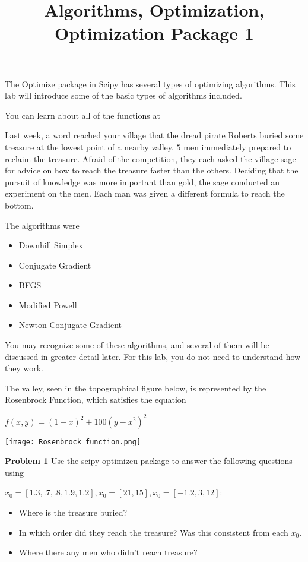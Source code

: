 \documentclass[12pt]{article}
\begin{document}
\title{Algorithms, Optimization, Optimization Package 1}

The Optimize package in Scipy has several types of optimizing algorithms. This lab will introduce some of the basic types of algorithms included.

You can learn about all of the functions at


Last week, a word reached your village that the dread pirate Roberts buried some treasure at the lowest point of a nearby valley. $5$ men immediately prepared to reclaim the treasure. Afraid of the competition, they each asked the village sage for advice on how to reach the treasure faster than the others. Deciding that the pursuit of knowledge was more important than gold, the sage conducted an experiment on the men. Each man was given a different formula to reach the bottom.  

The algorithms were 
\begin{itemize}
\item Downhill Simplex
\item Conjugate Gradient
\item BFGS
\item Modified Powell
\item Newton Conjugate Gradient
\end{itemize}

You may recognize some of these algorithms, and several of them will be discussed in greater detail later. For this lab, you do not need to understand how they work.


The valley, seen in the topographical figure below, is represented by the Rosenbrock Function, 
which satisfies the equation

\begin{center}
$f(x,y) = (1-x)^2 + 100(y-x^2)^2$
 
\texttt{[image: Rosenbrock\_function.png]}
\end{center}


\textbf{Problem 1}
Use the scipy optimizeu package to answer the following questions using

$x_0 = [1.3,.7,.8,1.9,1.2], x_0 = [21,15], x_0 = [-1.2, 3, 12]$:

\begin{itemize}
\item Where is the treasure buried?
\item In which order did they reach the treasure? Was this consistent from each $x_0$.
\item Where there any men who didn't reach treasure?
\end{itemize}
\end{document}
